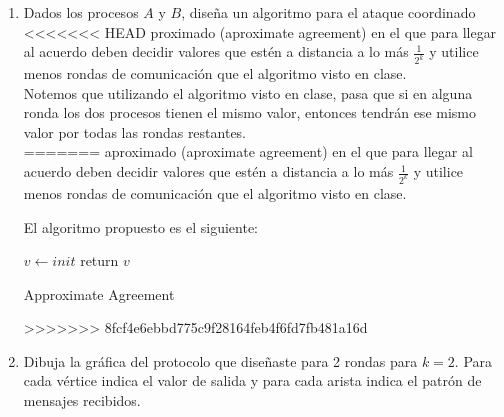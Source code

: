 \documentclass[12pt,a4paper]{report}
\begin{document}
\begin{enumerate}
	\item {
		Dados los procesos $A$ y $B$, diseña un algoritmo para el ataque coordinado
<<<<<<< HEAD
		proximado (aproximate agreement) en el que para llegar al acuerdo deben decidir
		valores que estén a distancia a lo más $\frac{1}{2^k}$ y utilice menos rondas
		de comunicación que el algoritmo visto en clase.\\

		Notemos que utilizando el algoritmo visto en clase, pasa que si en alguna
		ronda los dos procesos tienen el mismo valor, entonces tendrán ese mismo
		valor por todas las rondas restantes.\\
=======
		aproximado (aproximate agreement) en el que para llegar al acuerdo deben
		decidir	valores que estén a distancia a lo más $\frac{1}{2^k}$ y utilice
		menos rondas de comunicación que el algoritmo visto en clase.

		El algoritmo propuesto es el siguiente:\\

		\IncMargin{1em}
		\begin{algorithm}
			\BlankLine
			$v \leftarrow init$ \;
			return $v$\;
			\caption{Approximate Agreement}
		\end{algorithm}\DecMargin{1em}


>>>>>>> 8fcf4e6ebbd775c9f28164feb4f6fd7fb481a16d
	}

	\item {
		Dibuja la gráfica del protocolo que diseñaste para 2 rondas para $k = 2$.
		Para cada vértice indica el valor de salida y para cada arista indica el
		patrón de mensajes recibidos.\\\\

	}


\end{enumerate}
\end{document}
